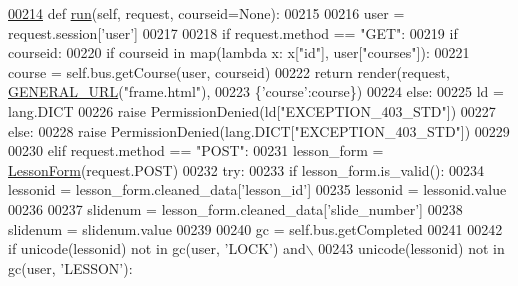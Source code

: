 \begin{DoxyCode}
\hypertarget{classCourse_1_1CourseUnit_1_1UiCourse_l00214}{}\hyperlink{classCourse_1_1CourseUnit_1_1UiCourse_aaaf2b8229f2b774f12e719bc0e6f13cb}{00214}     \textcolor{keyword}{def }\hyperlink{classCourse_1_1CourseUnit_1_1UiCourse_aaaf2b8229f2b774f12e719bc0e6f13cb}{run}(self, request, courseid=None):
00215         
00216         user = request.session[\textcolor{stringliteral}{'user'}]
00217 
00218         \textcolor{keywordflow}{if} request.method == \textcolor{stringliteral}{"GET"}:
00219             \textcolor{keywordflow}{if} courseid:
00220                 \textcolor{keywordflow}{if} courseid \textcolor{keywordflow}{in} map(\textcolor{keyword}{lambda} x: x[\textcolor{stringliteral}{"id"}], user[\textcolor{stringliteral}{"courses"}]):
00221                     course = self.bus.getCourse(user, courseid)
00222                     \textcolor{keywordflow}{return} render(request, \hyperlink{namespaceCourse_1_1macros_a9a69c2455c0c121b1c01960629575d7e}{GENERAL\_URL}(\textcolor{stringliteral}{"frame.html"}), 
00223                         \{\textcolor{stringliteral}{'course'}:course\})
00224                 \textcolor{keywordflow}{else}:
00225                     ld = lang.DICT
00226                     \textcolor{keywordflow}{raise} PermissionDenied(ld[\textcolor{stringliteral}{"EXCEPTION\_403\_STD"}])
00227             \textcolor{keywordflow}{else}:   
00228                 \textcolor{keywordflow}{raise} PermissionDenied(lang.DICT[\textcolor{stringliteral}{"EXCEPTION\_403\_STD"}])
00229 
00230         \textcolor{keywordflow}{elif} request.method == \textcolor{stringliteral}{"POST"}:
00231             lesson\_form = \hyperlink{classCourse_1_1forms_1_1LessonForm}{LessonForm}(request.POST)
00232             \textcolor{keywordflow}{try}:
00233                 \textcolor{keywordflow}{if} lesson\_form.is\_valid():
00234                     lessonid = lesson\_form.cleaned\_data[\textcolor{stringliteral}{'lesson\_id'}]
00235                     lessonid = lessonid.value
00236 
00237                     slidenum = lesson\_form.cleaned\_data[\textcolor{stringliteral}{'slide\_number'}]
00238                     slidenum = slidenum.value
00239 
00240                     gc = self.bus.getCompleted
00241 
00242                     \textcolor{keywordflow}{if} unicode(lessonid) \textcolor{keywordflow}{not} \textcolor{keywordflow}{in} gc(user, \textcolor{stringliteral}{'LOCK'}) \textcolor{keywordflow}{and}\(\backslash\)
00243                        unicode(lessonid) \textcolor{keywordflow}{not} \textcolor{keywordflow}{in} gc(user, \textcolor{stringliteral}{'LESSON'}):

\end{DoxyCode}
